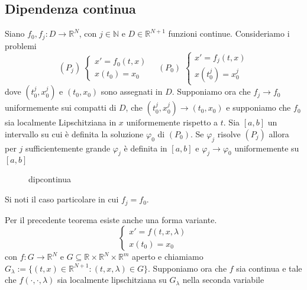 \subsection{Dipendenza continua}
\begin{theorem}
    Siano \(f_{0}, f_{j} : D \to \mathbb{R}^{N}\), con \(j \in \mathbb{N}\) e
    \(D \in \mathbb{R}^{N+1}\) funzioni continue. Consideriamo i problemi
    \[
        (P_{j})\,\,\begin{cases}
            x' = f_{0}(t, x) \\
            x(t_{0}) = x_{0}
        \end{cases}
        \quad
        (P_{0}) \,\,
        \begin{cases}
            x' = f_{j}(t, x) \\
            x(t_{0}^{j}) = x_{0}^{j}
        \end{cases}
    \]
    dove \({(t_{0}^{j}, x_{0}^{j})}\) e \((t_{0},x_{0})\) sono assegnati in
    \(D\). Supponiamo ora che \(f_{j}\to f_{0}\) uniformemente sui compatti di
    \(D\), che \((t_{0}^{j}, x_{0}^{j}) \to {(t_{0},x_{0})}\) e supponiamo che
    \(f_{0}\) sia localmente Lipschitziana in \(x\) uniformemente rispetto a
    \(t\).
    Sia \([a,b]\) un intervallo su cui è definita la soluzione \(\varphi_{0}\)
    di \((P_{0})\). Se \(\varphi_j\) risolve \((P_{j})\) allora per \(j\)
    sufficientemente grande \(\varphi_j\) è definita in \([a,b]\) e \(\varphi_j
    \to \varphi_{0}\) uniformemente su \([a,b]\) 
\end{theorem}
\begin{figure}[ht]
    \centering
    \caption{dipcontinua}\label{fig:dipcontinua}
\end{figure}
\begin{remark}
    Si noti il caso particolare in cui \(f_{j}=f_{0}\).
\end{remark}
Per il precedente teorema esiste anche una forma variante.
    \[
        \begin{cases}
            x'=f(t, x, \lambda) \\
            x{(t_{0})} = x_{0}
        \end{cases}
    \]
    con \(f : G \to \mathbb{R}^{N}\) e \(G \subseteq \mathbb{R}\times
    \mathbb{R}^{N} \times \mathbb{R}^{m} \) aperto e chiamiamo \(G_\lambda :=
    \{{(t,x)} \in \mathbb{R}^{N+1} : {(t,x,\lambda)} \in G\} \). Supponiamo ora
    che \(f\) sia continua e tale che \(f{(\cdot , \cdot ,\lambda)}\) sia
    localmente lipschitziana su \(G_\lambda\) nella seconda variabile
